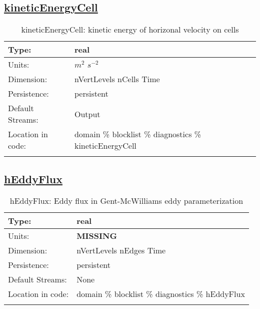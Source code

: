 \subsection[kineticEnergyCell]{\hyperref[sec:var_tab_diagnostics]{kineticEnergyCell}}
\label{subsec:var_sec_diagnostics_kineticEnergyCell}
\begin{center}
\begin{longtable}{| p{2.0in} | p{4.0in} |}
        \hline 
        Type: & real \\
        \hline 
        Units: & $m^2$ $s^{-2}$ \\
        \hline 
        Dimension: & nVertLevels nCells Time \\
        \hline 
        Persistence: & persistent \\
        \hline 
		 Default Streams: & Output  \\
        \hline 
		 Location in code: & domain \% blocklist \% diagnostics \% kineticEnergyCell \\
		 \hline 
    \caption{kineticEnergyCell: kinetic energy of horizonal velocity on cells}
\end{longtable}
\end{center}
\subsection[hEddyFlux]{\hyperref[sec:var_tab_diagnostics]{hEddyFlux}}
\label{subsec:var_sec_diagnostics_hEddyFlux}
\begin{center}
\begin{longtable}{| p{2.0in} | p{4.0in} |}
        \hline 
        Type: & real \\
        \hline 
        Units: & {\bf \color{red} MISSING} \\
        \hline 
        Dimension: & nVertLevels nEdges Time \\
        \hline 
        Persistence: & persistent \\
        \hline 
		 Default Streams: & None \\
        \hline 
		 Location in code: & domain \% blocklist \% diagnostics \% hEddyFlux \\
		 \hline 
    \caption{hEddyFlux: Eddy flux in Gent-McWilliams eddy parameterization}
\end{longtable}
\end{center}
